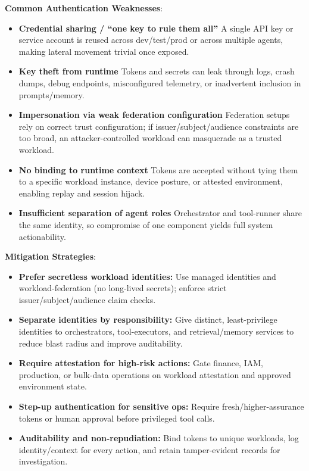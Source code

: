 \begin{TNtwocol}
    \textbf{Common Authentication Weaknesses}:
    \begin{itemize}
        \item \textbf{Credential sharing / “one key to rule them all”} A single API key or service account is reused across dev/test/prod or across multiple agents, making lateral movement trivial once exposed.
        \item \textbf{Key theft from runtime} Tokens and secrets can leak through logs, crash dumps, debug endpoints, misconfigured telemetry, or inadvertent inclusion in prompts/memory.
        \item \textbf{Impersonation via weak federation configuration} Federation setups rely on correct trust configuration; if issuer/subject/audience constraints are too broad, an attacker-controlled workload can masquerade as a trusted workload.
        \item \textbf{No binding to runtime context} Tokens are accepted without tying them to a specific workload instance, device posture, or attested environment, enabling replay and session hijack.
        \item \textbf{Insufficient separation of agent roles} Orchestrator and tool-runner share the same identity, so compromise of one component yields full system actionability.
    \end{itemize}

    \textbf{Mitigation Strategies}:
    \begin{itemize}
        \item \textbf{Prefer secretless workload identities:} Use managed identities and workload-federation (no long-lived secrets); enforce strict issuer/subject/audience claim checks.
        \item \textbf{Separate identities by responsibility:} Give distinct, least-privilege identities to orchestrators, tool-executors, and retrieval/memory services to reduce blast radius and improve auditability.
        \item \textbf{Require attestation for high-risk actions:} Gate finance, IAM, production, or bulk-data operations on workload attestation and approved environment state.
        \item \textbf{Step-up authentication for sensitive ops:} Require fresh/higher-assurance tokens or human approval before privileged tool calls.
        \item \textbf{Auditability and non-repudiation:} Bind tokens to unique workloads, log identity/context for every action, and retain tamper-evident records for investigation.
    \end{itemize}


\end{TNtwocol}
